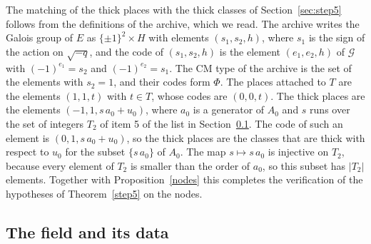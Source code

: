 \documentclass[11pt,letterpaper]{article}
\numberwithin{equation}{section}
\begin{document}
The matching of the thick places with the thick classes of Section~\ref{sec:step5} follows from the definitions of the archive, which we read. The archive writes the Galois group of $E$ as $\{\pm1\}^2\times H$ with elements $(s_1,s_2,h)$, where $s_1$ is the sign of the action on $\sqrt{-q}$, and the code of $(s_1,s_2,h)$ is the element $(e_1,e_2,h)$ of $\mathcal G$ with $(-1)^{e_1}=s_2$ and $(-1)^{e_2}=s_1$. The CM type of the archive is the set of the elements with $s_2=1$, and their codes form $\Phi$. The places attached to $T$ are the elements $(1,1,t)$ with $t\in T$, whose codes are $(0,0,t)$. The thick places are the elements $(-1,1,s\,a_0+u_0)$, where $a_0$ is a generator of $A_0$ and $s$ runs over the set of integers $T_2$ of item 5 of the list in Section~\ref{sec:data}. The code of such an element is $(0,1,s\,a_0+u_0)$, so the thick places are the classes that are thick with respect to $u_0$ for the subset $\{s\,a_0\}$ of $A_0$. The map $s\mapsto s\,a_0$ is injective on $T_2$, because every element of $T_2$ is smaller than the order of $a_0$, so this subset has $|T_2|$ elements. Together with Proposition~\ref{nodes} this completes the verification of the hypotheses of Theorem~\ref{step5} on the nodes.

\subsection{The field and its data}\label{sec:data}
\end{document}
